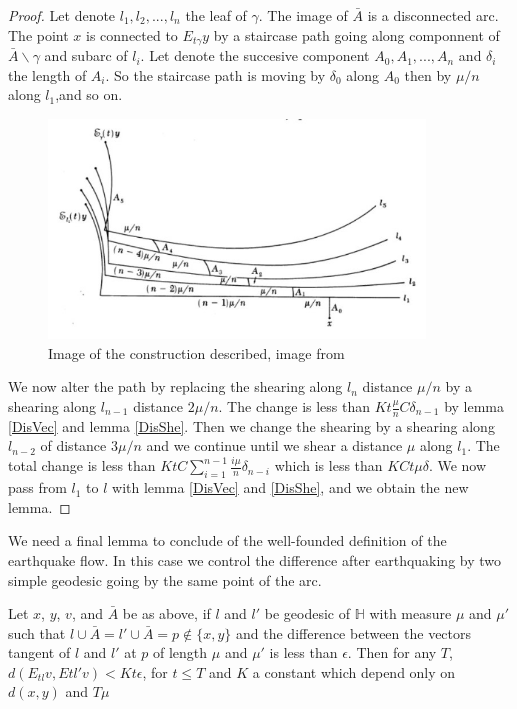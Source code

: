 \begin{proof}
Let denote $l_1,l_2,...,l_n$ the leaf of $\gamma$. The image of $\bar{A}$ is a disconnected arc. The point $x$ is connected to $E_{t \gamma}y$ by a staircase path going along componnent of $\bar{A} \backslash \gamma$ and subarc of $l_i$. Let denote the succesive component $A_0,A_1,...,A_n$ and $\delta_i$ the length of $A_i$. So the staircase path is moving by $\delta_0$ along $A_0$ then by $\mu / n$ along $l_1$,and so on.

\begin{figure}[h!]
\centering
\includegraphics[width=10cm]{Image/ProofEarthquake.jpg}
\caption{Image of the construction described, image from \cite{NielsenRealizationPro}}
\end{figure}

We now alter the path by replacing the shearing along $l_n$ distance $\mu / n$ by a shearing along $l_{n-1}$ distance $2 \mu /n$. The change is less than $Kt \frac{\mu}{n}C \delta_{n-1}$ by lemma \ref{DisVec} and lemma \ref{DisShe}. Then we change the shearing by a shearing along $l_{n-2}$ of distance $3 \mu /n$ and we continue until we shear a distance $\mu$ along $l_1$. The total change is less than $KtC\sum_{i=1}^{n-1}\frac{i \mu}{n} \delta_{n-i}$
 which is less than $KCt \mu \delta$.
 We now pass from $l_1$ to $l$ with lemma \ref{DisVec} and \ref{DisShe}, and we obtain the new lemma.
\end{proof}

We need a final lemma to conclude of the well-founded definition of the earthquake flow. In this case we control the difference after earthquaking by two simple geodesic going by the same point of the arc.

\begin{lem}
Let $x$, $y$, $v$, and $\bar{A}$ be as above, if $l$ and $l'$ be geodesic of $\mathbb{H}$ with measure $\mu$ and $\mu'$ such that $l \cup \bar{A} = l' \cup \bar{A}=p \notin \{x,y\}$ and the difference between the vectors tangent of $l$ and $l'$ at $p$ of length $\mu$ and $\mu'$ is less than
$\epsilon$.
Then for any $T$, $d(E_{t l}v,E{t l'}v)<Kt \epsilon $, for $t \leq T$ and $K$ a constant which depend only on $d(x,y)$ and $T \mu$
\end{lem}

